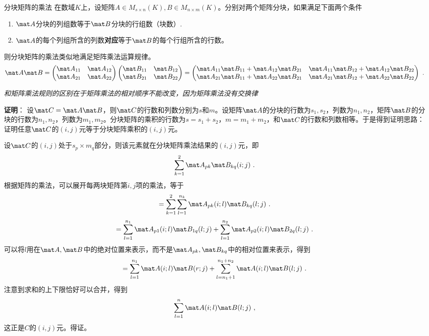 
\begin{theorem}{分块矩阵的乘法}
在数域$K$上，设矩阵$A\in{M_{s\times{n}}(K)},B\in{M_{n\times{m}}(K)}$。分别对两个矩阵分块，如果满足下面两个条件
\begin{enumerate}
\item $\mat A$分块的列组数等于$\mat B$分块的行组数（块数）.
\item $\mat A$的每个列组所含的列数\textbf{对应}等于$\mat B$的每个行组所含的行数。
\end{enumerate}
则分块矩阵的乘法类似地满足矩阵乘法运算规律。
\begin{equation}
\mat A\mat B=
\begin{pmatrix}
\mat A_{11} & \mat A_{12}\\
\mat A_{21} & \mat A_{22}
\end{pmatrix}
\begin{pmatrix}
\mat B_{11} & \mat B_{12}\\
\mat B_{21} & \mat B_{22}
\end{pmatrix}
=
\begin{pmatrix}
\mat A_{11}\mat B_{11}+\mat A_{12}\mat B_{21} & \mat A_{11}\mat B_{12}+\mat A_{12}\mat B_{22}\\
\mat A_{21}\mat B_{11}+\mat A_{22}\mat B_{21} & \mat A_{21}\mat B_{12}+\mat A_{22}\mat B_{22}
\end{pmatrix}~.
\end{equation}
\end{theorem}
\textsl{和矩阵乘法规则的区别在于矩阵乘法的相对顺序不能改变，因为矩阵乘法没有交换律}

\textbf{证明}：
设$\mat C=\mat A\mat B$，则$\mat C$的行数和列数分别为$s$和$m$。设矩阵$\mat A$的分块的行数为$s_1,s_2$，列数为$n_1,n_2$，矩阵$\mat B$的分块的行数为$n_1,n_2$，列数为$m_1,m_2$。分块矩阵的乘积的行数为$s=s_1+s_2$，$m=m_1+m_2$，和$\mat C$的行数和列数相等。于是得到证明思路：证明任意$\mat C$的$(i,j)$元等于分块矩阵乘积的$(i,j)$元。

设$\mat C$的$(i,j)$处于$s_p\times{m_q}$部分，则该元素就在分块矩阵乘法结果的$(i,j)$元，即
\[\sum_{k=1}^{2}\mat A_{pk}\mat B_{kq}(i;j)~.\]
根据矩阵的乘法，可以展开每两块矩阵第$i,j$项的乘法，等于
\[=\sum_{k=1}^{2}\sum_{l=1}^{n_k}\mat A_{pk}(i;l)\mat B_{kq}(l;j)~.\]
\[=\sum_{l=1}^{n_1}\mat A_{p1}(i;l)\mat B_{1q}(l;j)+\sum_{l=1}^{n_2}\mat A_{p2}(i;l)\mat B_{2q}(l;j)~.\]
可以将$l$用在$\mat A,\mat B$中的绝对位置来表示，而不是$\mat A_{pk},\mat B_{kq}$中的相对位置来表示，得到
\[=\sum_{l=1}^{n_1}\mat A(i;l)\mat B(r;j)+\sum_{l=n_1+1}^{n_1+n_2}\mat A(i;l)\mat B(l;j)~.\]
注意到求和的上下限恰好可以合并，得到
\[\sum_{l=1}^{n}\mat A(i;l)\mat B(l;j)~,\]
这正是$C$的$(i,j)$元。得证。


